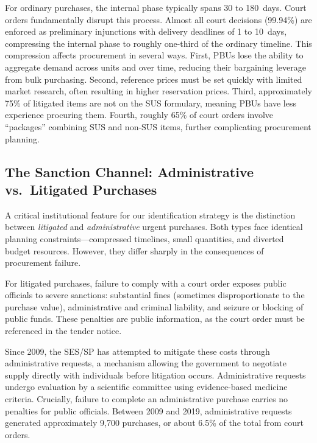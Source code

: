 For ordinary purchases, the internal phase typically spans 30 to 180~days. Court orders fundamentally disrupt this process. Almost all court decisions (99.94\%) are enforced as preliminary injunctions with delivery deadlines of 1 to 10~days, compressing the internal phase to roughly one-third of the ordinary timeline. This compression affects procurement in several ways. First, PBUs lose the ability to aggregate demand across units and over time, reducing their bargaining leverage from bulk purchasing. Second, reference prices must be set quickly with limited market research, often resulting in higher reservation prices. Third, approximately 75\% of litigated items are not on the SUS formulary, meaning PBUs have less experience procuring them. Fourth, roughly 65\% of court orders involve ``packages'' combining SUS and non-SUS items, further complicating procurement planning.

\subsection{The Sanction Channel: Administrative vs.\ Litigated Purchases}
\label{sec:sanction_channel}

A critical institutional feature for our identification strategy is the distinction between \textit{litigated} and \textit{administrative} urgent purchases. Both types face identical planning constraints---compressed timelines, small quantities, and diverted budget resources. However, they differ sharply in the consequences of procurement failure.

For litigated purchases, failure to comply with a court order exposes public officials to severe sanctions: substantial fines (sometimes disproportionate to the purchase value), administrative and criminal liability, and seizure or blocking of public funds. These penalties are public information, as the court order must be referenced in the tender notice.

Since 2009, the SES/SP has attempted to mitigate these costs through administrative requests, a mechanism allowing the government to negotiate supply directly with individuals before litigation occurs. Administrative requests undergo evaluation by a scientific committee using evidence-based medicine criteria. Crucially, failure to complete an administrative purchase carries no penalties for public officials. Between 2009 and 2019, administrative requests generated approximately 9,700 purchases, or about 6.5\% of the total from court orders.

